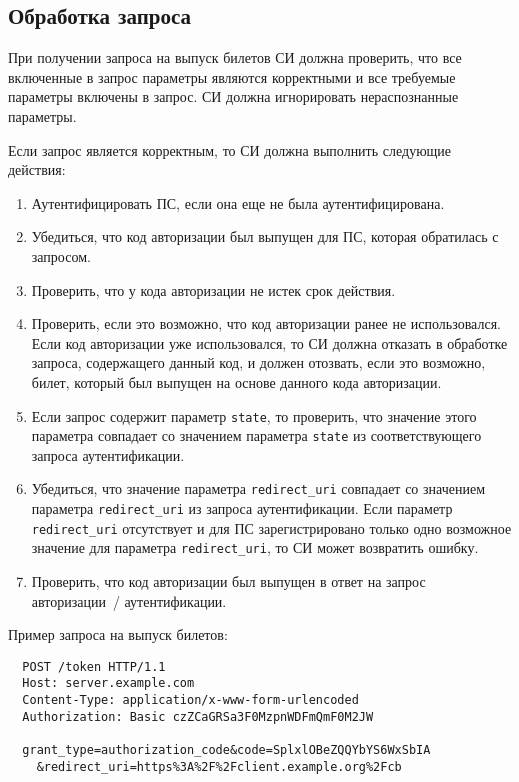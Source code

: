 \label{REQRESP.Token}

\subsection{Обработка запроса}\label{REQRESP.Token.Req}

При получении запроса на выпуск билетов СИ должна проверить, что все включенные в
запрос параметры являются корректными и все требуемые параметры включены в
запрос.
%
СИ должна игнорировать нераспознанные параметры.

Если запрос является корректным, то СИ должна выполнить следующие действия:
\begin{enumerate}
\item 
Аутентифицировать ПС, если она еще не была аутентифицирована.

\item 
Убедиться, что код авторизации был выпущен для ПС, которая обратилась с 
запросом.

\item Проверить, что у кода авторизации не истек срок действия.

\item Проверить, если это возможно, что код авторизации ранее 
не использовался. Если код авторизации уже использовался, 
то СИ должна отказать в обработке запроса, содержащего данный код, 
и должен отозвать, если это возможно, билет, 
который был выпущен на основе данного кода авторизации.

\item Если запрос содержит параметр \lstinline{state},
то проверить, что значение этого параметра совпадает со значением 
параметра \lstinline{state} из соответствующего запроса аутентификации.

\item Убедиться, что значение параметра \lstinline{redirect_uri} совпадает 
со значением параметра \lstinline{redirect_uri} из запроса аутентификации. 
Если параметр \lstinline{redirect_uri} отсутствует и для ПС
зарегистрировано только одно возможное значение 
для параметра \lstinline{redirect_uri}, то СИ может возвратить ошибку.

\item  
Проверить, что код авторизации был выпущен в ответ на запрос авторизации~/ 
аутентификации. 
\end{enumerate}

Пример запроса на выпуск билетов:
\begin{lstlisting}
  POST /token HTTP/1.1
  Host: server.example.com
  Content-Type: application/x-www-form-urlencoded
  Authorization: Basic czZCaGRSa3F0MzpnWDFmQmF0M2JW

  grant_type=authorization_code&code=SplxlOBeZQQYbYS6WxSbIA
    &redirect_uri=https%3A%2F%2Fclient.example.org%2Fcb
\end{lstlisting}

